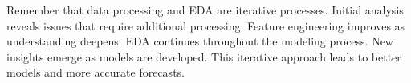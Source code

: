 Remember that data processing and EDA are iterative processes. Initial analysis reveals issues that require additional processing. Feature engineering improves as understanding deepens. EDA continues throughout the modeling process. New insights emerge as models are developed. This iterative approach leads to better models and more accurate forecasts.


